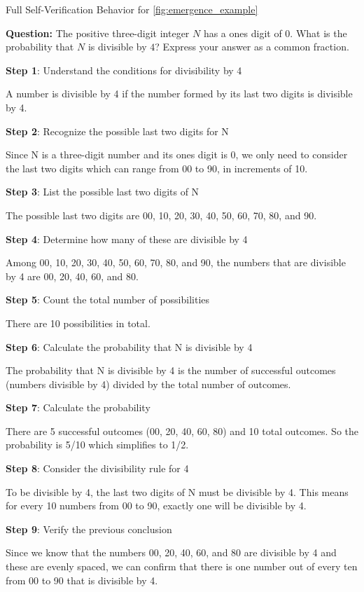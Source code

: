 \begin{promptbox}{Full Self-Verification Behavior for \autoref{fig:emergence_example}}

\textbf{Question:} The positive three-digit integer $N$ has a ones digit of $0$. What is the probability that $N$ is divisible by $4$? Express your answer as a common fraction.

\textbf{Step 1}: Understand the conditions for divisibility by 4

A number is divisible by 4 if the number formed by its last two digits is divisible by 4.
 
\textbf{Step 2}: Recognize the possible last two digits for N

Since N is a three-digit number and its ones digit is 0, we only need to consider the last two digits which can range from 00 to 90, in increments of 10.
 
\textbf{Step 3}: List the possible last two digits of N

The possible last two digits are 00, 10, 20, 30, 40, 50, 60, 70, 80, and 90.
 
\textbf{Step 4}: Determine how many of these are divisible by 4

Among 00, 10, 20, 30, 40, 50, 60, 70, 80, and 90, the numbers that are divisible by 4 are 00, 20, 40, 60, and 80.
 
\textbf{Step 5}: Count the total number of possibilities

There are 10 possibilities in total.
 
\textbf{Step 6}: Calculate the probability that N is divisible by 4

The probability that N is divisible by 4 is the number of successful outcomes (numbers divisible by 4) divided by the total number of outcomes.
 
\textbf{Step 7}: Calculate the probability

There are 5 successful outcomes (00, 20, 40, 60, 80) and 10 total outcomes. So the probability is 5/10 which simplifies to 1/2.
 
\textbf{Step 8}: Consider the divisibility rule for 4

To be divisible by 4, the last two digits of N must be divisible by 4. This means for every 10 numbers from 00 to 90, exactly one will be divisible by 4.
 
{\color{red}\textbf{Step 9}: Verify the previous conclusion}

Since we know that the numbers 00, 20, 40, 60, and 80 are divisible by 4 and these are evenly spaced, we can confirm that there is one number out of every ten from 00 to 90 that is divisible by 4.
 

\end{promptbox}
